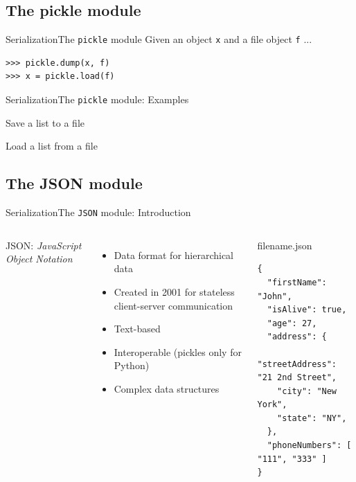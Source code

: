 \documentclass[10pt,compress]{beamer} %
\begin{document}
\subsection{The pickle module}

\begin{frame}[fragile]{Serialization}{The \texttt{pickle} module}
	Given an object \texttt{x} and a file object \texttt{f} ...
\begin{verbatim}
>>> pickle.dump(x, f) 
>>> x = pickle.load(f)
\end{verbatim}
\end{frame}

\begin{frame}[plain]{Serialization}{The \texttt{pickle} module: Examples}
	\begin{exampleblock}{Save a list  to a file}
	\vspace{-0.2cm}
	
	\vspace{-0.2cm}
	\end{exampleblock}

	\begin{exampleblock}{Load a list from a file}
	\vspace{-0.2cm}
	
	\vspace{-0.2cm}
	\end{exampleblock}
\end{frame}

\subsection{The JSON module}

\begin{frame}[fragile]{Serialization}{The \texttt{JSON} module: Introduction}
	\begin{columns}
		JSON: \textit{JavaScript Object Notation}
		\begin{itemize}
		\item Data format for hierarchical data
        	\item Created in 2001 for stateless client-server communication
	        \item Text-based
		\item Interoperable (pickles only for Python)
	        \item Complex data structures
		\end{itemize}

        \begin{exampleblock}{filename.json}
		\begin{lstlisting}[basicstyle=\scriptsize]
{
  "firstName": "John",
  "isAlive": true,
  "age": 27,
  "address": {
    "streetAddress": "21 2nd Street",
    "city": "New York",
    "state": "NY",
  },
  "phoneNumbers": [ "111", "333" ]
}
\end{lstlisting}
        \end{exampleblock}
	\end{columns}
\end{frame}
\end{document}
